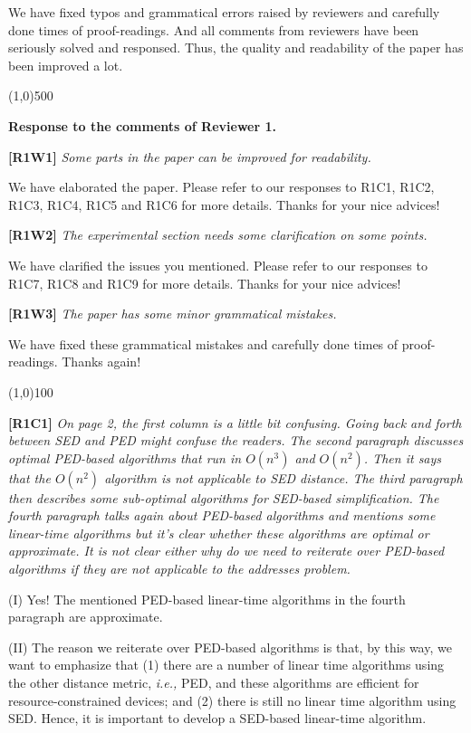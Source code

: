 \documentclass{letter}
\newcommand{\ie}{\emph{i.e.,}\xspace}
\begin{document}
We have fixed typos and grammatical errors raised by reviewers and carefully done times of proof-readings. And all comments from reviewers have been seriously solved and responsed. Thus, the quality and readability of the paper has been improved a lot.

\line(1,0){500}

\textbf{Response to the comments of Reviewer 1.}

\textbf{[R1W1]} \emph{Some parts in the paper can be improved for readability.}

We have elaborated the paper. Please refer to our responses to R1C1, R1C2, R1C3, R1C4, R1C5 and R1C6 for more details. Thanks for your nice advices!

\textbf{[R1W2]} \emph{The experimental section needs some clarification on some points.}

We have clarified the issues you mentioned. Please refer to our responses to R1C7, R1C8 and R1C9 for more details. Thanks for your nice advices!

\textbf{[R1W3]} \emph{The paper has some minor grammatical mistakes.}

We have fixed these grammatical mistakes and carefully done times of proof-readings. Thanks again!

\line(1,0){100}

\textbf{[R1C1]} \emph{On page 2, the first column is a little bit confusing. Going back and forth between SED and PED might confuse the readers. The second paragraph discusses optimal PED-based algorithms that run in $O(n^3)$ and $O(n^2)$. Then it says that the $O(n^2)$ algorithm is not applicable to SED distance. The third paragraph then describes some sub-optimal algorithms for SED-based simplification. {The fourth paragraph talks again about PED-based algorithms and mentions some linear-time algorithms but it's clear whether these algorithms are optimal or approximate. It is not clear either why do we need to reiterate over PED-based algorithms if they are not applicable to the addresses problem.}}

(I) Yes! The mentioned PED-based linear-time algorithms in the fourth paragraph are approximate.

(II) The reason we reiterate over PED-based algorithms is that, by this way, we want to emphasize that (1) there are a number of linear time algorithms using the other distance metric, \ie PED, and these algorithms are efficient for resource-constrained devices; and (2) there is still no linear time algorithm using SED. Hence, it is important to develop a SED-based linear-time algorithm.
\end{document}
